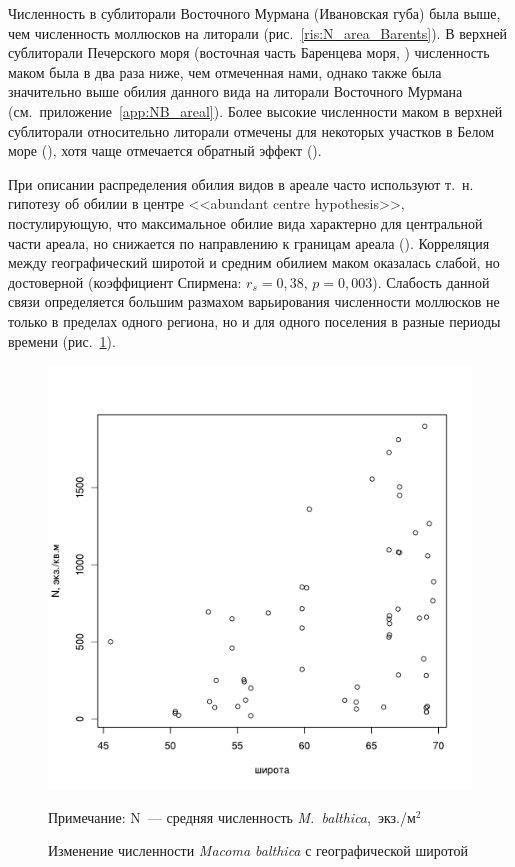 Численность в сублиторали Восточного Мурмана (Ивановская губа) была выше, чем численность моллюсков на литорали (рис.~\ref{ris:N_area_Barents}).
В верхней сублиторали Печерского моря (восточная часть Баренцева моря, \cite{Denisenko_et_al_2003}) численность маком была в два раза ниже, чем отмеченная нами, однако также была значительно выше обилия данного вида на литорали Восточного Мурмана (см.~приложение~\ref{app:NB_areal}).
Более высокие численности маком в верхней сублиторали относительно литорали отмечены для некоторых участков в Белом море (\cite{Semenova_1974}), хотя чаще отмечается обратный эффект (\cite{Semenova_1974, Maximovich_et_al_1991}).

При описании распределения обилия видов в ареале часто используют т.~н. гипотезу об обилии в центре <<abundant centre hypothesis>>, постулирующую, что максимальное обилие вида характерно для центральной части ареала, но снижается по направлению к границам ареала (\cite{Sagarin_et_al_2006}).
Корреляция между географический широтой и средним обилием маком оказалась слабой, но достоверной (коэффициент Спирмена: $r_{s} = 0,38$, $p = 0,003$).
Слабость данной связи определяется большим размахом варьирования численности моллюсков не только в пределах одного региона, но и для одного поселения в разные периоды времени (рис.~\ref{ris:lat_vs_Nmean}). 
	\begin{figure}[p]
    \includegraphics[width=\textwidth]{../macrodistribution/lat_vs_Nmean1.pdf}
    \caption{Изменение численности {\it Macoma balthica} с географической широтой}

{\footnotesize Примечание: N~--- средняя численность {\it M.~balthica},~экз./м$^2$}
    \label{ris:lat_vs_Nmean}
	\end{figure}
